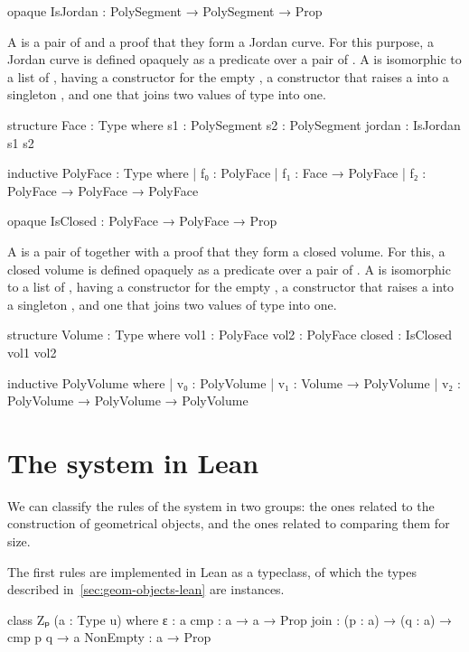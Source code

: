 \documentclass[12pt]{article} %
\begin{document}
{\begin{leancode}
opaque IsJordan : PolySegment → PolySegment → Prop
\end{leancode} %

A \face{} is a pair of \psegment{} and a proof that they form a Jordan
curve. %
For this purpose, a Jordan curve is defined opaquely as a predicate  over a pair of \psegment{}. %
A \pface{} is isomorphic to a list of \face, having a constructor for the empty \pface, a constructor that raises a \face{} into a singleton \pface, and one that joins two values of type \pface{} into one. %
\begin{leancode}
structure Face : Type where
  s1 : PolySegment
  s2 : PolySegment
  jordan : IsJordan s1 s2

inductive PolyFace : Type where
| f₀ : PolyFace
| f₁ : Face → PolyFace
| f₂ : PolyFace → PolyFace → PolyFace

opaque IsClosed : PolyFace → PolyFace → Prop
\end{leancode}

A \volume{} is a pair of \pface{} together with a proof that they form a
closed volume. %
For this, a closed volume is defined opaquely as a predicate  over a pair of \pface. %
A \pvolume{} is isomorphic to a list of \volume, having a constructor for the empty \pvolume, a constructor that raises a \volume{} into a singleton \pvolume, and one that joins two values of type \pvolume{} into one. %
\begin{leancode}
structure Volume : Type where
  vol1 : PolyFace
  vol2 : PolyFace
  closed : IsClosed vol1 vol2

inductive PolyVolume where
| v₀ : PolyVolume
| v₁ : Volume → PolyVolume
| v₂ : PolyVolume → PolyVolume → PolyVolume
\end{leancode}

\section{The \zp{} system in Lean}\label{sec:zp-system} %

We can classify the rules of the \zp{} system in two groups: the ones related to the construction of geometrical objects, and the ones related to comparing them for size. %

The first rules are implemented in Lean as a typeclass, of which the types described in~\ref{sec:geom-objects-lean} are instances. %
\begin{leancode}
class Zₚ (a : Type u) where
  ε : a
  cmp : a → a → Prop
  join : (p : a) → (q : a) → cmp p q → a
  NonEmpty : a → Prop


\end{leancode}}
\end{document}
